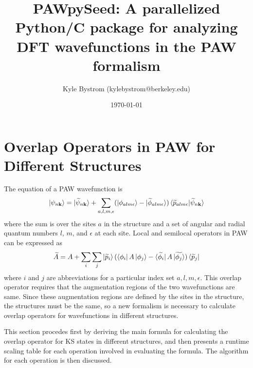 \documentclass[12pt]{article}
\begin{document}
\newcommand{\ind}{lm\epsilon}

\title{PAWpySeed: A parallelized Python/C package for analyzing
DFT wavefunctions in the PAW formalism}
\author[1]{Kyle Bystrom (kylebystrom@berkeley.edu)}
\date{\today}
\maketitle
{}

\section{Overlap Operators in PAW for Different Structures}

The equation of a PAW wavefunction is\cite{blochl}
\begin{equation}
\ket{\psi_{n\mathbf{k}}}=\ket{\widetilde{\psi}_{n\mathbf{k}}}+
\sum_{a,l,m,\epsilon}(\ket{\phi_{a\ind}}-\ket{\widetilde{\phi}_{a\ind}})
\braket{\widetilde{p}_{a\ind}|\widetilde{\psi}_{n\mathbf{k}}}
\label{eq:1}
\end{equation}
where the sum is over the sites $a$ in the structure and a set of
angular and radial quantum numbers $l$, $m$, and $\epsilon$ at each site.
Local and semilocal operators in PAW can be expressed as
\begin{equation}
\widetilde{A}=A+\sum_i\sum_j\ket{\widetilde{p}_i}(\bra{\phi_i}A\ket{\phi_j}
-\bra{\widetilde{\phi_i}}A\ket{\widetilde{\phi_j}})\bra{\widetilde{p}_j}
\label{eq:loc}
\end{equation}
where $i$ and $j$ are abbreviations for a particular index set
$a,l,m,\epsilon$. This overlap operator requires that the augmentation
regions of the two wavefunctions are same. Since these augmentation regions
are defined by the sites in the structure, the structures must be the same,
so a new formalism is necessary to calculate overlap operators for wavefunctions
in different structures.

This section procedes first by deriving the main formula for calculating
the overlap operator for KS states in different structures, and then
presents a runtime scaling table for each operation involved in evaluating
the formula. The algorithm for each operation is then discussed.
\end{document}
